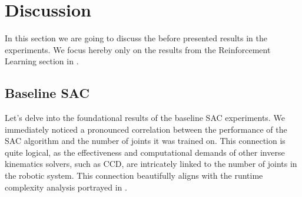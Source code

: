 \chapter{Discussion}\label{chap:discussion}

In this section we are going to discuss the before presented results in the experiments. We focus hereby only on the results from the Reinforcement Learning section in .

\section{Baseline SAC}


Let's delve into the foundational results of the baseline SAC experiments. We immediately noticed a pronounced correlation between the performance of the SAC algorithm and the number of joints it was trained on. This connection is quite logical, as the effectiveness and computational demands of other inverse kinematics solvers, such as CCD, are intricately linked to the number of joints in the robotic system. This connection beautifully aligns with the runtime complexity analysis portrayed in .


